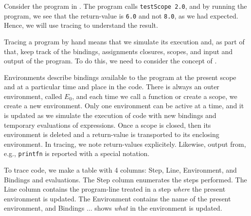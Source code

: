 \documentclass[fsharpNotes.tex]{subfiles}
\begin{document}
Consider the program in .
%
%
The program calls \lstinline{testScope 2.0}, and by running the program, we see that the return-value is \lstinline{6.0} and not \lstinline{8.0}, as we had expected. Hence, we will use tracing to understand the result.

Tracing a program by hand means that we simulate its execution and, as part of that, keep track of the bindings, assignments closures, scopes, and input and output of the program. To do this, we need to consider the concept of .

Environments describe bindings available to the program at the present scope and at a particular time and place in the code. There is always an outer environment, called $E_0$, and each time we call a function or create a scope, we create a new environment. Only one environment can be active at a time, and it is updated as we simulate the execution of code with new bindings and temporary evaluations of expressions. Once a scope is closed, then its environment is deleted and a return-value is transported to its enclosing environment. In tracing, we note return-values explicitely. Likewise, output from, e.g., \lstinline{printfn} is reported with a special notation.

To trace code, we make a table with 4 columns: Step, Line, Environment, and Bindings and evaluations. The Step column enumerates the steps performed. The Line column contains the program-line treated in a step {\em where} the present environment is updated. The Environment contains the name of the present environment, and Bindings $\ldots$ shows {\em what}  in the environment is updated.
\end{document}
